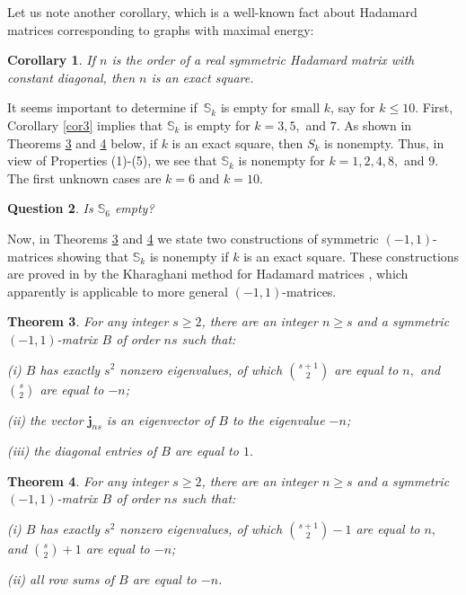 \documentclass[12pt]{article}%
\newtheorem{theorem}{Theorem}[section]
\newtheorem{corollary}[theorem]{Corollary}
\newtheorem{question}[theorem]{Question}
\begin{document}
Let us note another corollary, which is a well-known fact about Hadamard
matrices corresponding to graphs with maximal energy:

\begin{corollary}
If $n$ is the order of a real symmetric Hadamard matrix with constant
diagonal, then $n$ is an exact square.
\end{corollary}

It seems important to determine if\ $\mathbb{S}_{k}$ is empty for small $k$,
say for $k\leq10.$ First, Corollary \ref{cor3} implies that $\mathbb{S}_{k}$
is empty for $k=3,5,$ and $7.$ As shown in Theorems \ref{thj} and \ref{thj1}
below, if $k$ is an exact square, then $S_{k}$ is nonempty. Thus, in view of
Properties (1)-(5), we see that $\mathbb{S}_{k}$ is nonempty for $k=1,2,4,8,$
and $9.$ The first unknown cases are $k=6$ and $k=10.$

\begin{question}
Is $\mathbb{S}_{6}$ empty?
\end{question}

Now, in Theorems \ref{thj} and \ref{thj1} we state two constructions of
symmetric $\left(  -1,1\right)  $-matrices showing that $\mathbb{S}_{k}$ is
nonempty if $k$ is an exact square. These constructions are proved in
\cite{Nik15b} by the Kharaghani method for Hadamard matrices \cite{Kha85},
which apparently is applicable to more general $\left(  -1,1\right)
$-matrices.\medskip

\begin{theorem}
\label{thj}For any integer $s\geq2$, there are an integer $n\geq s$ and a
symmetric $\left(  -1,1\right)  $-matrix $B$ of order $ns$ such that:

(i) $B$ has exactly $s^{2}$ nonzero eigenvalues, of which $\binom{s+1}{2}$ are
equal to $n,$ and $\binom{s}{2}$ are equal to $-n$;

(ii) the vector $\mathbf{j}_{ns}$ is an eigenvector of $B$ to the eigenvalue
$-n$;

(iii) the diagonal entries of $B$ are equal to $1.$
\end{theorem}

\begin{theorem}
\label{thj1}For any integer $s\geq2$, there are an integer $n\geq s$ and a
symmetric $\left(  -1,1\right)  $-matrix $B$ of order $ns$ such that:

(i) $B$ has exactly $s^{2}$ nonzero eigenvalues, of which $\binom{s+1}{2}-1$
are equal to $n,$ and $\binom{s}{2}+1$ are equal to $-n$;

(ii) all row sums of $B$ are equal to $-n$.
\end{theorem}
\end{document}
